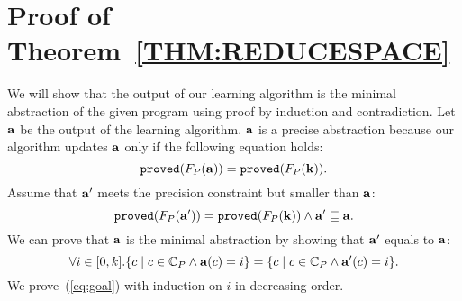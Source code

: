 \chapter{Proof of Theorem~\ref{THM:REDUCESPACE}}\label{sec:proof}

We will show that the output of our learning algorithm is the minimal abstraction of the given program using proof by induction and contradiction.
Let ${\bf a}$ be the output of the learning algorithm.  
${\bf a}$ is a precise abstraction because our algorithm updates ${\bf a}$ only if the following equation holds:
\[
{\tt proved}(F_P({\bf a})) = {\tt proved}(F_P({\bf k})).
\]
Assume that ${\bf a}'$ meets the precision constraint but smaller than ${\bf a}$:
\begin{equation}\label{eq:assumption}
{\tt proved}(F_P({\bf a}')) = {\tt proved}(F_P({\bf k})) \land
{\bf a}' \sqsubseteq {\bf a}.
\end{equation}
We can prove that ${\bf a}$ is the minimal abstraction by showing that ${\bf a}'$ equals to ${\bf a}$:
\begin{equation}\label{eq:goal}
\forall i \in [0,k].\{c \mid c \in \mathbb{C}_P \land {\bf a}(c) = i\} = \{c \mid c\in \mathbb{C}_P \land {\bf a}'(c) = i\}.
\end{equation}
We prove~(\ref{eq:goal}) with induction on $i$ in decreasing order.
